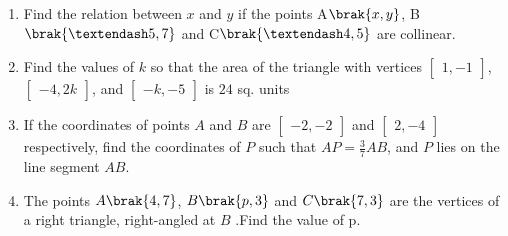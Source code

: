 \begin{enumerate}
  \item Find the relation between $x$ and $y$ if the points A$\brak{x,y}$, B$\brak{–5,7}$ and C$\brak{–4, 5}$ are collinear.

     \item Find the values of $k$ so that the area of the triangle with vertices $\begin{bmatrix}1, -1\end{bmatrix}$, $\begin{bmatrix}-4, 2k\end{bmatrix}$, and $\begin{bmatrix}-k, -5\end{bmatrix}$ is $24$ sq. units

     \item If the coordinates of points $A$ and $B$ are $\begin{bmatrix}-2, -2\end{bmatrix}$ and $\begin{bmatrix}2, -4\end{bmatrix}$ respectively, find the coordinates of $P$ such that $AP = \frac{3}{7} AB$, and $P$ lies on the line segment $AB$.

     \item The points $A\brak{4, 7}$, $B\brak{p, 3}$ and $C\brak{7, 3}$ are the vertices of a right triangle, right-angled at $B$ .Find the value of p.
     \end{enumerate}
